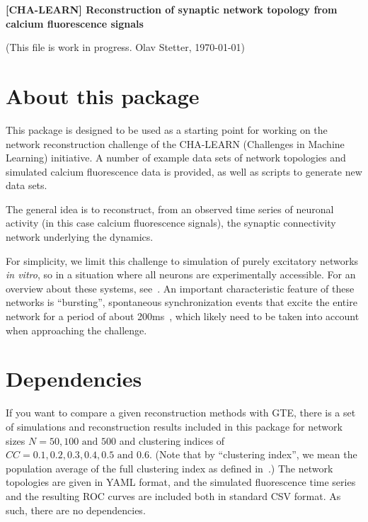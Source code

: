 \documentclass[a4paper,11pt]{article}
\begin{document}
\vspace{5cm} 
    \huge
    \textbf{[CHA-LEARN] Reconstruction of synaptic network topology from calcium fluorescence signals}
    \normalsize

\vspace{1cm}
(This file is work in progress. Olav Stetter, \today)
\vspace{1cm}


\section{About this package}

This package is designed to be used as a starting point for working on the network reconstruction challenge of the CHA-LEARN (Challenges in Machine Learning) initiative.
A number of example data sets of network topologies and simulated calcium fluorescence data is provided, as well as scripts to generate new data sets.

The general idea is to reconstruct, from an observed time series of neuronal activity (in this case calcium fluorescence signals), the synaptic connectivity network underlying the dynamics.

For simplicity, we limit this challenge to simulation of purely excitatory networks \emph{in vitro}, so in a situation where all neurons are experimentally accessible.
For an overview about these systems, see~\cite{Eckmann:2007p48}.
An important characteristic feature of these networks is ``bursting'', spontaneous synchronization events that excite the entire network for a period of about 200ms~\cite{Eytan:2006p66,Cohen:2008cv}, which likely need to be taken into account when approaching the challenge.


\section{Dependencies}

If you want to compare a given reconstruction methods with GTE, there is a set of simulations and reconstruction results included in this package for network sizes $N = 50, 100 \text{ and } 500$ and clustering indices of $CC = 0.1, 0.2, 0.3, 0.4, 0.5 \text{ and } 0.6$.
(Note that by ``clustering index'', we mean the population average of the full clustering index as defined in~\cite{Fagiolo:2007p53}.)
The network topologies are given in YAML format, and the simulated fluorescence time series and the resulting ROC curves are included both in standard CSV format. As such, there are no dependencies.
\end{document}

